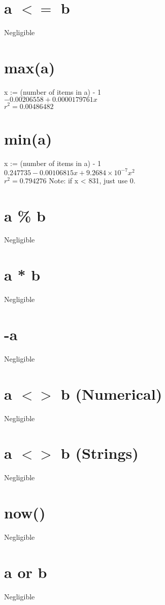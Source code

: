 \documentclass[12pt]{article}
\begin{document}
	\section{a $<=$ b}
	Negligible
	
	\section{max(a)}
	x := (number of items in a) - 1\\
	$-0.00206558 + 0.0000179761 x$\\
	$r^2 = 0.00486482$
	
	\section{min(a)}
	x := (number of items in a) - 1\\
	$0.247735 - 0.00106815 x + 9.2684 \times 10^{-7} x^2$\\
	$r^2 = 0.794276$
	Note: if x < 831, just use 0.
	
	\section{a \% b}
	Negligible
	
	\section{a * b}
	Negligible
	
	\section{-a}
	Negligible
	
	\section{a $<>$ b (Numerical)}
	Negligible
	
	\section{a $<>$ b (Strings)}
	Negligible
	
	\section{now()}
	Negligible
	
	\section{a or b}
	Negligible
	
\end{document}
